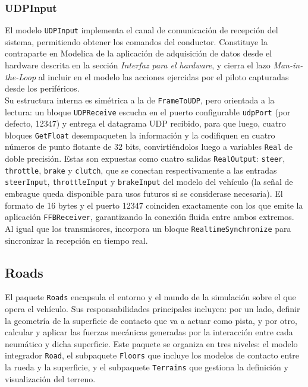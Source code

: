 \subsubsection{UDPInput}

El modelo \verb|UDPInput| implementa el canal de comunicación de recepción del sistema, permitiendo obtener los comandos del conductor. Constituye la contraparte en Modelica de la aplicación de adquisición de datos desde el hardware descrita en la sección \textit{Interfaz para el hardware}, y cierra el lazo \textit{Man-in-the-Loop} al incluir en el modelo las acciones ejercidas por el piloto capturadas desde los periféricos.\\

Su estructura interna es simétrica a la de \verb|FrameToUDP|, pero orientada a la lectura: un bloque \verb|UDPReceive| escucha en el puerto configurable \verb|udpPort| (por defecto, 12347) y entrega el datagrama UDP recibido, para que luego, cuatro bloques \verb|GetFloat| desempaqueten la información y la codifiquen en cuatro números de punto flotante de $32$ bits, convirtiéndolos luego a variables \verb|Real| de doble precisión. Estas son expuestas como cuatro salidas \verb|RealOutput|: \verb|steer|, \verb|throttle|, \verb|brake| y \verb|clutch|, que se conectan respectivamente a las entradas \verb|steerInput|, \verb|throttleInput| y \verb|brakeInput| del modelo del vehículo (la señal de embrague queda disponible para usos futuros si se considerase necesaria). El formato de 16 bytes y el puerto 12347 coinciden exactamente con los que emite la aplicación \verb|FFBReceiver|, garantizando la conexión fluida entre ambos extremos. Al igual que los transmisores, incorpora un bloque \verb|RealtimeSynchronize| para sincronizar la recepción en tiempo real.\\

\subsection{Roads}

El paquete \verb|Roads| encapsula el entorno y el mundo de la simulación sobre el que opera el vehículo. Sus responsabilidades principales incluyen: por un lado, definir la geometría de la superficie de contacto que va a actuar como pista, y por otro, calcular y aplicar las fuerzas mecánicas generadas por la interacción entre cada neumático y dicha superficie. Este paquete se organiza en tres niveles: el modelo integrador \verb|Road|, el subpaquete \verb|Floors| que incluye los modelos de contacto entre la rueda y la superficie, y el subpaquete \verb|Terrains| que gestiona la definición y visualización del terreno.\\


